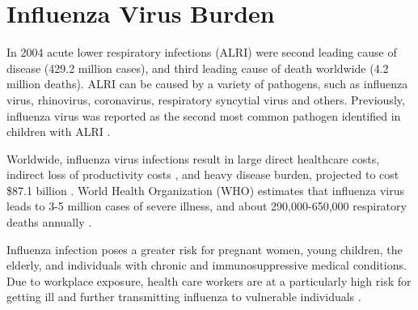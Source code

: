 \section{Influenza Virus Burden}

In 2004 acute lower respiratory infections (ALRI) were second leading cause of disease (429.2 million cases), and third leading cause of death worldwide \cite{world2008global} (4.2 million deaths). ALRI can be caused by a variety of pathogens, such as influenza virus, rhinovirus, coronavirus, respiratory syncytial virus and others. Previously, influenza virus was reported as the second most common pathogen identified in children with ALRI \cite{nair2011global}.

Worldwide, influenza virus infections result in large direct healthcare costs, indirect loss of productivity costs \cite{de2015systematic}, and heavy disease burden, projected to cost \$87.1 billion \cite{molinari2007annual}. World Health Organization (WHO) estimates that influenza virus leads to 3-5 million cases of severe illness, and about 290,000-650,000 respiratory deaths annually \cite{influenza_seasonal_2018}.

Influenza infection poses a greater risk for pregnant women, young children, the elderly, and individuals with chronic and immunosuppressive medical conditions. Due to workplace exposure, health care workers are at a particularly high risk for getting ill and further transmitting influenza to vulnerable individuals \cite{influenza_seasonal_2018}.